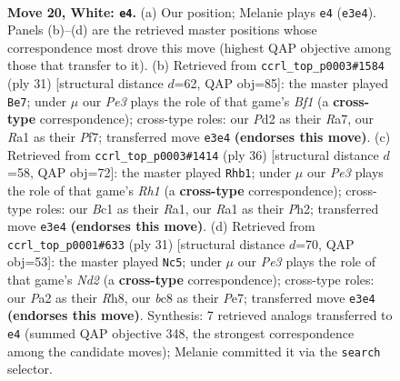 \documentclass[11pt]{article}
\begin{document}
\clearpage

\begin{figure}[p]\centering
\begin{subfigure}{0.46\textwidth}\centering
\resizebox{\linewidth}{!}{%
\newchessgame
\chessboard[
  setfen={1rb2r2/pp4k1/6pp/2pBbp1n/7P/N3P1P1/PP1PKP2/R1B1R3 w - - 0 20},
  showmover=false,
  pgfstyle=straightmove, color=movearrow, markmove={e3-e4}
]}
\caption{}
\end{subfigure}\hfill
\begin{subfigure}{0.46\textwidth}\centering
\resizebox{\linewidth}{!}{%
\newchessgame
\chessboard[
  setfen={4kb1r/r4pp1/p1bppn1p/1p6/4P1P1/3B1P2/PPPBN2P/1K1R3R b k - 1 16},
  showmover=false,
  pgfstyle=straightmove, color=movearrow, markmove={f8-e7}
]}
\caption{}
\end{subfigure}
\\[4pt]
\begin{subfigure}{0.46\textwidth}\centering
\resizebox{\linewidth}{!}{%
\newchessgame
\chessboard[
  setfen={r6r/3pkppp/p1bb1n2/4p3/4P3/P1NBBP2/2P2KPP/R6R w - - 2 19},
  showmover=false,
  pgfstyle=straightmove, color=movearrow, markmove={h1-b1}
]}
\caption{}
\end{subfigure}\hfill
\begin{subfigure}{0.46\textwidth}\centering
\resizebox{\linewidth}{!}{%
\newchessgame
\chessboard[
  setfen={r1b1k2r/pp1nppbp/3p2p1/1P6/2N5/4B1P1/P3PPBP/1R3RK1 b kq - 5 16},
  showmover=false,
  pgfstyle=straightmove, color=movearrow, markmove={d7-c5}
]}
\caption{}
\end{subfigure}
\caption{\textbf{Move 20, White: \texttt{e4}.} (a) Our position; Melanie plays \texttt{e4} (\texttt{e3e4}). Panels (b)--(d) are the retrieved master positions whose correspondence most drove this move (highest QAP objective among those that transfer to it). (b) Retrieved from \texttt{ccrl\_top\_p0003\#1584} (ply 31) [structural distance $d$=62, QAP obj=85]: the master played \texttt{Be7}; under $\mu$ our \emph{Pe3} plays the role of that game's \emph{Bf1} (a \textbf{cross-type} correspondence); cross-type roles: our \emph{P}d2 as their \emph{R}a7, our \emph{R}a1 as their \emph{P}f7; transferred move \texttt{e3e4} \textbf{(endorses this move)}. (c) Retrieved from \texttt{ccrl\_top\_p0003\#1414} (ply 36) [structural distance $d$=58, QAP obj=72]: the master played \texttt{Rhb1}; under $\mu$ our \emph{Pe3} plays the role of that game's \emph{Rh1} (a \textbf{cross-type} correspondence); cross-type roles: our \emph{B}c1 as their \emph{R}a1, our \emph{R}a1 as their \emph{P}h2; transferred move \texttt{e3e4} \textbf{(endorses this move)}. (d) Retrieved from \texttt{ccrl\_top\_p0001\#633} (ply 31) [structural distance $d$=70, QAP obj=53]: the master played \texttt{Nc5}; under $\mu$ our \emph{Pe3} plays the role of that game's \emph{Nd2} (a \textbf{cross-type} correspondence); cross-type roles: our \emph{P}a2 as their \emph{R}h8, our \emph{b}c8 as their \emph{P}e7; transferred move \texttt{e3e4} \textbf{(endorses this move)}. Synthesis: 7 retrieved analogs transferred to \texttt{e4} (summed QAP objective 348, the strongest correspondence among the candidate moves); Melanie committed it via the \texttt{search} selector.}
\label{fig:thought-m38}
\end{figure}
\end{document}
